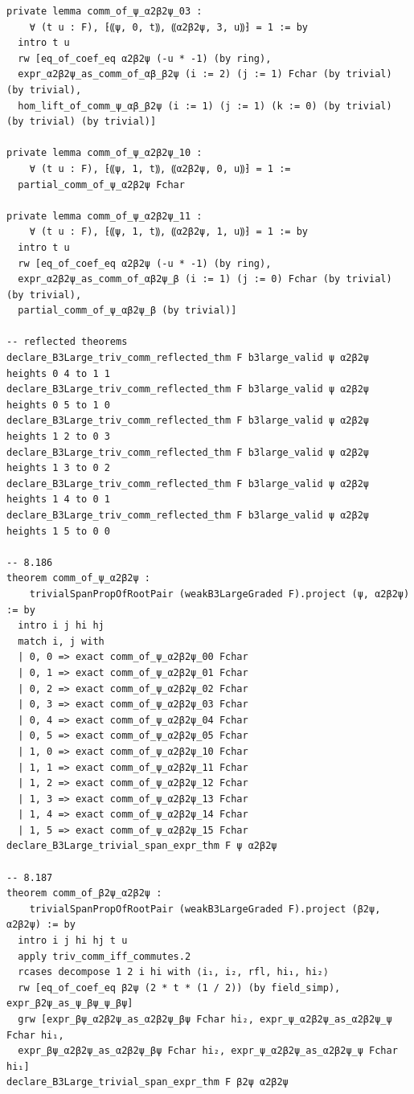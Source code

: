 \begin{Verbatim}
private lemma comm_of_ψ_α2β2ψ_03 :
    ∀ (t u : F), ⁅⸨ψ, 0, t⸩, ⸨α2β2ψ, 3, u⸩⁆ = 1 := by
  intro t u
  rw [eq_of_coef_eq α2β2ψ (-u * -1) (by ring),
  expr_α2β2ψ_as_comm_of_αβ_β2ψ (i := 2) (j := 1) Fchar (by trivial) (by trivial),
  hom_lift_of_comm_ψ_αβ_β2ψ (i := 1) (j := 1) (k := 0) (by trivial) (by trivial) (by trivial)]

private lemma comm_of_ψ_α2β2ψ_10 :
    ∀ (t u : F), ⁅⸨ψ, 1, t⸩, ⸨α2β2ψ, 0, u⸩⁆ = 1 :=
  partial_comm_of_ψ_α2β2ψ Fchar

private lemma comm_of_ψ_α2β2ψ_11 :
    ∀ (t u : F), ⁅⸨ψ, 1, t⸩, ⸨α2β2ψ, 1, u⸩⁆ = 1 := by
  intro t u
  rw [eq_of_coef_eq α2β2ψ (-u * -1) (by ring),
  expr_α2β2ψ_as_comm_of_αβ2ψ_β (i := 1) (j := 0) Fchar (by trivial) (by trivial),
  partial_comm_of_ψ_αβ2ψ_β (by trivial)]

-- reflected theorems
declare_B3Large_triv_comm_reflected_thm F b3large_valid ψ α2β2ψ heights 0 4 to 1 1
declare_B3Large_triv_comm_reflected_thm F b3large_valid ψ α2β2ψ heights 0 5 to 1 0
declare_B3Large_triv_comm_reflected_thm F b3large_valid ψ α2β2ψ heights 1 2 to 0 3
declare_B3Large_triv_comm_reflected_thm F b3large_valid ψ α2β2ψ heights 1 3 to 0 2
declare_B3Large_triv_comm_reflected_thm F b3large_valid ψ α2β2ψ heights 1 4 to 0 1
declare_B3Large_triv_comm_reflected_thm F b3large_valid ψ α2β2ψ heights 1 5 to 0 0

-- 8.186
theorem comm_of_ψ_α2β2ψ :
    trivialSpanPropOfRootPair (weakB3LargeGraded F).project (ψ, α2β2ψ) := by
  intro i j hi hj
  match i, j with
  | 0, 0 => exact comm_of_ψ_α2β2ψ_00 Fchar
  | 0, 1 => exact comm_of_ψ_α2β2ψ_01 Fchar
  | 0, 2 => exact comm_of_ψ_α2β2ψ_02 Fchar
  | 0, 3 => exact comm_of_ψ_α2β2ψ_03 Fchar
  | 0, 4 => exact comm_of_ψ_α2β2ψ_04 Fchar
  | 0, 5 => exact comm_of_ψ_α2β2ψ_05 Fchar
  | 1, 0 => exact comm_of_ψ_α2β2ψ_10 Fchar
  | 1, 1 => exact comm_of_ψ_α2β2ψ_11 Fchar
  | 1, 2 => exact comm_of_ψ_α2β2ψ_12 Fchar
  | 1, 3 => exact comm_of_ψ_α2β2ψ_13 Fchar
  | 1, 4 => exact comm_of_ψ_α2β2ψ_14 Fchar
  | 1, 5 => exact comm_of_ψ_α2β2ψ_15 Fchar
declare_B3Large_trivial_span_expr_thm F ψ α2β2ψ

-- 8.187
theorem comm_of_β2ψ_α2β2ψ :
    trivialSpanPropOfRootPair (weakB3LargeGraded F).project (β2ψ, α2β2ψ) := by
  intro i j hi hj t u
  apply triv_comm_iff_commutes.2
  rcases decompose 1 2 i hi with ⟨i₁, i₂, rfl, hi₁, hi₂⟩
  rw [eq_of_coef_eq β2ψ (2 * t * (1 / 2)) (by field_simp), expr_β2ψ_as_ψ_βψ_ψ_βψ]
  grw [expr_βψ_α2β2ψ_as_α2β2ψ_βψ Fchar hi₂, expr_ψ_α2β2ψ_as_α2β2ψ_ψ Fchar hi₁,
  expr_βψ_α2β2ψ_as_α2β2ψ_βψ Fchar hi₂, expr_ψ_α2β2ψ_as_α2β2ψ_ψ Fchar hi₁]
declare_B3Large_trivial_span_expr_thm F β2ψ α2β2ψ


\end{Verbatim}
